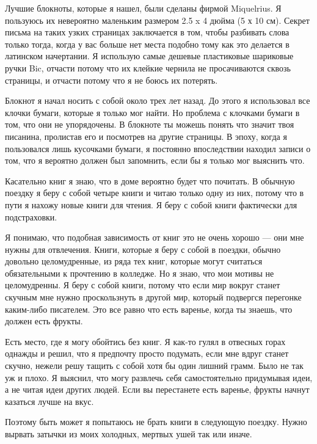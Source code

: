 \documentclass[ebook,12pt,oneside,openany]{memoir}
\begin{document}
Лучшие блокноты, которые я нашел, были сделаны фирмой Miquelrius. Я
пользуюсь их невероятно маленьким размером 2.5 x 4 дюйма (5 х 10 см).
Секрет письма на таких узких страницах заключается в том, чтобы
разбивать слова только тогда, когда у вас больше нет места подобно
тому как это делается в латинском начертании. Я использую самые
дешевые пластиковые шариковые ручки Bic, отчасти потому что их клейкие
чернила не просачиваются сквозь страницы, и отчасти потому что я не
боюсь их потерять.

Блокнот я начал носить с собой около трех лет назад. До этого я
использовал все клочки бумаги, которые я только мог найти. Но проблема
с клочками бумаги в том, что они не упорядочены. В блокноте ты можешь
понять что значит твоя писанина, пролистав его и посмотрев на другие
страницы. В эпоху, когда я пользовался лишь кусочками бумаги, я
постоянно впоследствии находил записи о том, что я вероятно должен был
запомнить, если бы я только мог выяснить что.

Касательно книг я знаю, что в доме вероятно будет что почитать. В
обычную поездку я беру с собой четыре книги и читаю только одну из
них, потому что в пути я нахожу новые книги для чтения. Я беру с собой
книги фактически для подстраховки.

Я понимаю, что подобная зависимость от книг это не очень хорошо — они
мне нужны для отвлечения. Книги, которые я беру с собой в поездки,
обычно довольно целомудренные, из ряда тех книг, которые могут
считаться обязательными к прочтению в колледже. Но я знаю, что мои
мотивы не целомудренны. Я беру с собой книги, потому что если мир
вокруг станет скучным мне нужно проскользнуть в другой мир, который
подвергся перегонке каким-либо писателем. Это все равно что есть
варенье, когда ты знаешь, что должен есть фрукты.

Есть место, где я могу обойтись без книг. Я как-то гулял в отвесных
горах однажды и решил, что я предпочту просто подумать, если мне вдруг
станет скучно, нежели решу тащить с собой хотя бы один лишний грамм.
Было не так уж и плохо. Я выяснил, что могу развлечь себя
самостоятельно придумывая идеи, а не читая идеи других людей. Если вы
перестанете есть варенье, фрукты начнут казаться лучше на вкус.

Поэтому быть может я попытаюсь не брать книги в следующую поездку.
Нужно вырвать затычки из моих холодных, мертвых ушей так или иначе.
\end{document}
